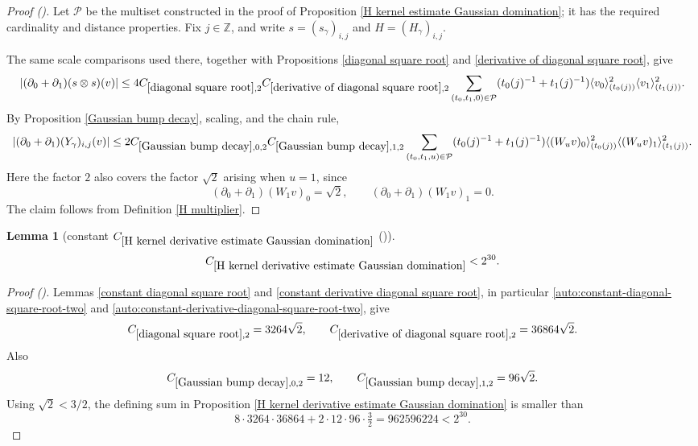 \documentclass[12pt,reqno]{amsart}
\newcommand{\auto}{{({\tiny\faCar})}}
\theoremstyle{plain}
\newtheorem{lemma}[theorem]{Lemma}
\numberwithin{equation}{section}
\theoremstyle{remark}
\newcommand{\uses}[1]{}
\newcommand{\usesdefs}[1]{}
\newcommand{\Z}{{\mathbb Z}}
\begin{document}
\begin{proof}[Proof \auto]
Let $\mathcal P$ be the multiset constructed in the proof of
Proposition \ref{H kernel estimate Gaussian domination}; it has the
required cardinality and distance properties. Fix $j\in\Z$, and write
$s=(s_\gamma)_{i,j}$ and $H=(H_\gamma)_{i,j}$.

The same scale comparisons used there, together with Propositions
\ref{diagonal square root} and
\ref{derivative of diagonal square root}, give
\[
|(\partial_0+\partial_1)(s\otimes s)(v)|
\le
4C_{\ref{diagonal square root},2}
C_{\ref{derivative of diagonal square root},2}
\sum_{(t_0,t_1,0)\in\mathcal P}
(t_0(j)^{-1}+t_1(j)^{-1})
\langle v_0\rangle_{(t_0(j))}^2
\langle v_1\rangle_{(t_1(j))}^2.
\]
By Proposition \ref{Gaussian bump decay}, scaling, and the chain rule,
\[
|(\partial_0+\partial_1)(Y_\gamma)_{i,j}(v)|
\le
2C_{\ref{Gaussian bump decay},0,2}
C_{\ref{Gaussian bump decay},1,2}
\sum_{(t_0,t_1,u)\in\mathcal P}
(t_0(j)^{-1}+t_1(j)^{-1})
\langle (W_uv)_0\rangle_{(t_0(j))}^2
\langle (W_uv)_1\rangle_{(t_1(j))}^2.
\]
Here the factor $2$ also covers the factor $\sqrt2$ arising when
$u=1$, since
\[
(\partial_0+\partial_1)(W_1v)_0=\sqrt2,
\qquad
(\partial_0+\partial_1)(W_1v)_1=0.
\]
The claim follows from Definition \ref{H multiplier}.
\end{proof}

\begin{lemma}[constant $C_{\ref{H kernel derivative estimate Gaussian domination}}$ \auto]\label{constant H kernel derivative estimate Gaussian domination}\uses{constant diagonal square root,constant derivative diagonal square root,diagonal square root,derivative of diagonal square root,Gaussian bump decay,H kernel derivative estimate Gaussian domination}\usesdefs{}
\begin{equation}\label{constant H kernel derivative estimate Gaussian domination bound}
C_{\ref{H kernel derivative estimate Gaussian domination}}
<2^{30}.
\end{equation}
\end{lemma}
\begin{proof}[Proof \auto]
Lemmas \ref{constant diagonal square root} and \ref{constant derivative diagonal square root}, in particular \eqref{auto:constant-diagonal-square-root-two} and \eqref{auto:constant-derivative-diagonal-square-root-two}, give
\[
C_{\ref{diagonal square root},2}=3264\sqrt2,
\qquad
C_{\ref{derivative of diagonal square root},2}=36864\sqrt2.
\]
Also
\[
C_{\ref{Gaussian bump decay},0,2}=12,
\qquad
C_{\ref{Gaussian bump decay},1,2}=96\sqrt2.
\]
Using $\sqrt2<3/2$, the defining sum in Proposition \ref{H kernel derivative estimate Gaussian domination} is smaller than
\[
8\cdot3264\cdot36864+2\cdot12\cdot96\cdot\tfrac32
=962596224<2^{30}.
\]
\end{proof}
\end{document}
